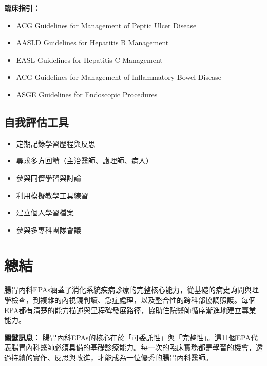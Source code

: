 \documentclass[12pt,a4paper]{article}
\begin{document}
\textbf{臨床指引：}
\begin{itemize}
    \item ACG Guidelines for Management of Peptic Ulcer Disease
    \item AASLD Guidelines for Hepatitis B Management
    \item EASL Guidelines for Hepatitis C Management
    \item ACG Guidelines for Management of Inflammatory Bowel Disease
    \item ASGE Guidelines for Endoscopic Procedures
\end{itemize}

\subsection{自我評估工具}
\begin{itemize}[nosep]
    \item 定期記錄學習歷程與反思
    \item 尋求多方回饋（主治醫師、護理師、病人）
    \item 參與同儕學習與討論
    \item 利用模擬教學工具練習
    \item 建立個人學習檔案
    \item 參與多專科團隊會議
\end{itemize}

\section{總結}

腸胃內科EPAs涵蓋了消化系統疾病診療的完整核心能力，從基礎的病史詢問與理學檢查，到複雜的內視鏡判讀、急症處理，以及整合性的跨科部協調照護。每個EPA都有清楚的能力描述與里程碑發展路徑，協助住院醫師循序漸進地建立專業能力。

\begin{importantbox}
\textbf{關鍵訊息：} 腸胃內科EPAs的核心在於「可委託性」與「完整性」。這11個EPA代表腸胃內科醫師必須具備的基礎診療能力。每一次的臨床實務都是學習的機會，透過持續的實作、反思與改進，才能成為一位優秀的腸胃內科醫師。
\end{importantbox}

\end{document}

